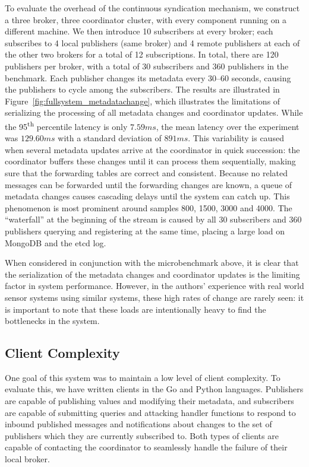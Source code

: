 To evaluate the overhead of the continuous syndication mechanism, we construct a three broker, three coordinator cluster, with every component running on a different machine.
We then introduce 10 subscribers at every broker; each subscribes to 4 local publishers (same broker) and 4 remote publishers at each of the other two brokers for a total of 12 subscriptions.
In total, there are 120 publishers per broker, with a total of 30 subscribers and 360 publishers in the benchmark.
Each publisher changes its metadata every 30--60 seconds, causing the publishers to cycle among the subscribers.
The results are illustrated in Figure~\ref{fig:fullsystem_metadatachange}, which illustrates the limitations of serializing the processing of all metadata changes and coordinator updates.
While the 95\textsuperscript{th} percentile latency is only $7.59ms$, the mean latency over the experiment was $129.60ms$ with a standard deviation of $891ms$.
This variability is caused when several metadata updates arrive at the coordinator in quick succession: the coordinator buffers these changes until it can process them sequentially, making sure that the forwarding tables are correct and consistent.
Because no related messages can be forwarded until the forwarding changes are known, a queue of metadata changes causes cascading delays until the system can catch up.
This phenomenon is most prominent around samples 800, 1500, 3000 and 4000.
The ``waterfall'' at the beginning of the stream is caused by all 30 subscribers and 360 publishers querying and registering at the same time, placing a large load on MongoDB and the etcd log.

When considered in conjunction with the microbenchmark above, it is clear that the serialization of the metadata changes and coordinator updates is the limiting factor in system performance.
However, in the authors' experience with real world sensor systems using similar systems, these high rates of change are rarely seen: it is important to note that these loads are intentionally heavy to find the bottlenecks in the system.

\subsection{Client Complexity}

One goal of this system was to maintain a low level of client complexity.
To evaluate this, we have written clients in the Go and Python languages.
Publishers are capable of publishing values and modifying their metadata, and subscribers are capable of submitting queries and attacking handler functions to respond to inbound published messages and notifications about changes to the set of publishers which they are currently subscribed to.
Both types of clients are capable of contacting the coordinator to seamlessly handle the failure of their local broker.

